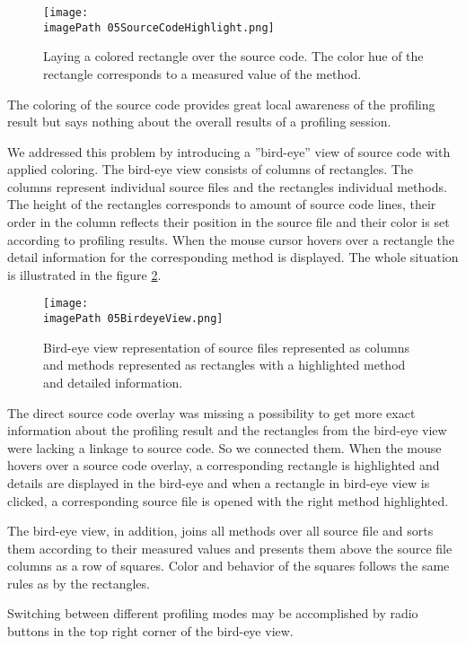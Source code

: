 \begin{figure}
	\centering
		\texttt{[image: \\imagePath 05SourceCodeHighlight.png]}
		\caption{Laying a colored rectangle over the source code. The color hue of the rectangle corresponds to a measured value of the method. }
	\label{fig:05SourceCodeHighlight}
\end{figure}

The coloring of the source code provides great local awareness of the profiling result but says nothing about the overall results of a profiling session. 

We addressed this problem by introducing a ''bird-eye'' view of source code with applied coloring. The bird-eye view consists of columns of rectangles. The columns represent individual source files and the rectangles individual methods. The height of the rectangles corresponds to amount of source code lines, their order in the column reflects their position in the source file and their color is set according to profiling results.
When the mouse cursor hovers over a rectangle the detail information for the corresponding method is displayed. The whole situation is illustrated in the figure \ref{fig:05BirdeyeView}.

\begin{figure}
	\centering
		\texttt{[image: \\imagePath 05BirdeyeView.png]}
		\caption{Bird-eye view representation of source files represented as columns and methods represented as rectangles with a highlighted method and detailed information. }
	\label{fig:05BirdeyeView}
\end{figure}

The direct source code overlay was missing a possibility to get more exact information about the profiling result and the rectangles from the bird-eye view were lacking a linkage to source code. So we connected them. When the mouse hovers over a source code overlay, a corresponding rectangle is highlighted and details are displayed in the bird-eye and when a rectangle in bird-eye view is clicked, a corresponding source file is opened  with the right method highlighted. 

The bird-eye view, in addition, joins all methods over all source file and sorts them according to their measured values and presents them above the source file columns as a row of squares. Color and behavior of the squares follows the same rules as by the rectangles.

Switching between different profiling modes may be accomplished by radio buttons in the top right corner of the bird-eye view.

